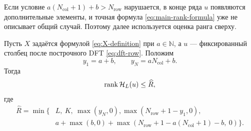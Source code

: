 Если условие
\(
    a(N_{\mathrm{col}}+1)+b>N_{\mathrm{row}}
\)
нарушается, в конце ряда $u$ появляются дополнительные элементы, и точная формула
\eqref{eq:main-rank-formula} уже не описывает общий случай. Поэтому далее
используется оценка ранга сверху.

\begin{statement}
\label{st:colrow-safe-rank-positive}
Пусть $X$ задаётся формулой \eqref{eq:X-definition} при $a\in\mathbb N$,
а $u$ --- фиксированный столбец после построчного DFT \eqref{eq:dft-row}.
Положим
\[
    y_1=a+b,
    \qquad
    y_N=aN_{\mathrm{col}}+b.
\]
Тогда
\begin{equation}
    \operatorname{rank} \mathcal H_L(u)
    \le
    \widehat{R},
    \label{eq:safe-rank-bound}
\end{equation}
где
\begin{equation}
    \begin{aligned}
    \widehat{R}
    =
    \min\{&
        L,\ K,\
        \max(y_N,0),
        \max(N_{\mathrm{row}}+1-y_1,0),
        \\
        &
        a+\max(b,0)
        +
        \max\left(
            N_{\mathrm{row}}+1-a(N_{\mathrm{col}}+1)-b,\ 0
        \right)
    \}.
    \end{aligned}
    \label{eq:y-safe-rank}
\end{equation}
\end{statement}

